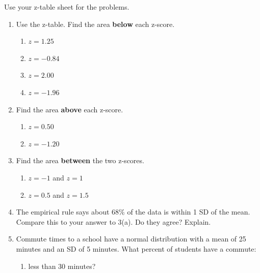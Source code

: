 \documentclass[11pt]{article}
\begin{document}
\vspace{0.6em}
Use your z-table sheet for the problems.

\partner

\newpage
\begin{enumerate}

\item Use the z-table. Find the area \textbf{below} each z-score.
\begin{enumerate}[itemsep=1.4em]
  \item $z = 1.25$ 
  \item $z = -0.84$ 
  \item $z = 2.00$ 
  \item $z = -1.96$ 
\end{enumerate}
\work{1em}

\item Find the area \textbf{above} each z-score.
\begin{enumerate}[itemsep=1.4em]
  \item $z = 0.50$ 
  \item $z = -1.20$ 
\end{enumerate}
\work{1em}

\item Find the area \textbf{between} the two z-scores.
\begin{enumerate}[itemsep=1.4em]
  \item $z = -1$ and $z = 1$ 
  \item $z = 0.5$ and $z = 1.5$ 
\end{enumerate}
\work{1em}

\item The empirical rule says about 68\% of the data is within 1 SD of the mean. Compare this to your answer to 3(a). Do they agree? Explain.

\work{3em}

\newpage
\item Commute times to a school have a normal distribution with a mean of 25 minutes and an SD of 5 minutes. What percent of students have a commute:
\begin{enumerate}[itemsep=1em]
  \item less than 30 minutes?


\end{enumerate}
\end{enumerate}
\end{document}
